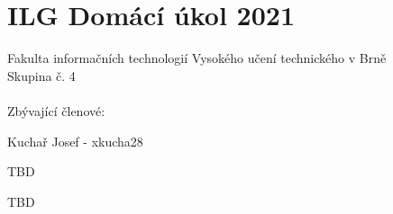 
\section*{ILG Domácí úkol 2021}
Fakulta informačních technologií Vysokého učení technického v Brně \\
Skupina č. 4 \\\\
Zbývající členové:

Kuchař Josef - xkucha28

TBD

TBD
